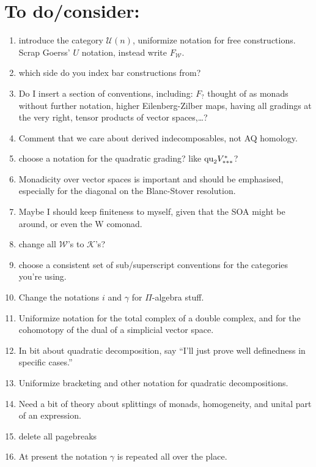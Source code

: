 \documentclass[11pt]{amsart}
\theoremstyle{plain}
\theoremstyle{definition}
\newcommand{\squishlist}{
  \setlength{\itemsep}{.5pt}
  \setlength{\parskip}{0pt}
  \setlength{\parsep}{0pt}}
\newcommand{\calW}{\mathcal{W}}
\newcommand{\calU}{\mathcal{U}}
\newcommand{\calK}{\mathcal{K}}
\theoremstyle{plain}
\begin{document}
\section{To do/consider:}
\begin{enumerate}\squishlist
\setlength{\parindent}{.25in}
\item introduce the category $\calU(n)$, uniformize notation for free constructions. Scrap Goerss' $U$ notation, instead write $F_{\calW}$.
\item which side do you index bar constructions from?
\item Do I insert a section of conventions, including: %
$F_?$ thought of as monads without further notation, %
higher Eilenberg-Zilber maps, %
having all gradings at the very right, tensor products of vector spaces,\ldots?
\item Comment that we care about derived indecomposables, not AQ homology.
\item choose a notation for the quadratic grading? like $\textup{qu}_2V^{*}_{***}$?
\item Monadicity over vector spaces is important and should be emphasised, especially for the diagonal on the Blanc-Stover resolution.
\item Maybe I should keep finiteness to myself, given that the SOA might be around, or even the W comonad.
\item change all $\calW$'s to $\calK$'s?
\item choose a consistent set of sub/superscript conventions for the categories you're using.
\item Change the notations $i$ and $\gamma$ for $\Pi$-algebra stuff.
\item Uniformize notation for the total complex of a double complex, and for the cohomotopy of the dual of a simplicial vector space.
\item In bit about quadratic decomposition, say ``I'll just prove well definedness in specific cases.''
\item Uniformize bracketing and other notation for quadratic decompositions.
\item Need a bit of theory about splittings of monads, homogeneity, and unital part of an expression.
\item delete all pagebreaks
\item At present the notation $\gamma$ is repeated all over the place.

\end{enumerate}
\end{document}
